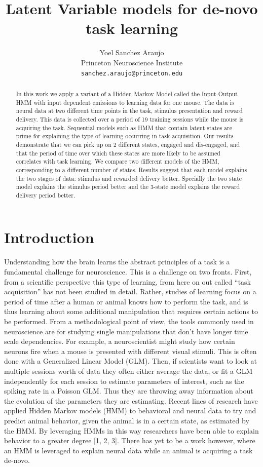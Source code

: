 \documentclass{article}
\title{Latent Variable models for de-novo task learning}
\author{%
  Yoel Sanchez Araujo\\
  Princeton Neuroscience Institute\\
  \texttt{sanchez.araujo@princeton.edu} \\
}
\begin{document}
\maketitle

\begin{abstract}
In this work we apply a variant of a Hidden Markov Model called the Input-Output HMM with input dependent emissions to learning data for one mouse. The data is neural data at two different time points in the task, stimulus presentation and reward delivery. This data is collected over a period of 19 training sessions while the mouse is acquiring the task. Sequential models such as HMM that contain latent states are prime for explaining the type of learning occurring in task acquisition. Our results demonstrate that we can pick up on 2 different states, engaged and dis-engaged, and that the period of time over which these states are more likely to be assumed correlates with task learning. We compare two different models of the HMM, corresponding to a different number of states. Results suggest that each model explains the two stages of data: stimulus and rewarded delivery better. Specially the two state model explains the stimulus period better and the 3-state model explains the reward delivery period better. 
\end{abstract}


\section{Introduction}
Understanding how the brain learns the abstract principles of a task is a fundamental challenge for neuroscience. This is a challenge on two fronts. First, from a scientific perspective this type of learning, from here on out called “task acquisition” has not been studied in detail. Rather, studies of learning focus on a period of time after a human or animal knows how to perform the task, and is thus learning about some additional manipulation that requires certain actions to be performed. From a methodological point of view, the tools commonly used in neuroscience are for studying single manipulations that don’t have longer time scale dependencies. For example, a neuroscientist might study how certain neurons fire when a mouse is presented with different visual stimuli. This is often done with a Generalized Linear Model (GLM). Then, if scientists want to look at multiple sessions worth of data they often either average the data, or fit a GLM independently for each session to estimate parameters of interest, such as the spiking rate in a Poisson GLM. Thus they are throwing away information about the evolution of the parameters they are estimating.  Recent lines of research have applied Hidden Markov models (HMM) to behavioral and neural data to try and predict animal behavior, given the animal is in a certain state, as estimated by the HMM. By leveraging HMMs in this way researchers have been able to explain behavior to a greater degree [1, 2, 3]. There has yet to be a work however, where an HMM is leveraged to explain neural data while an animal is acquiring a task de-novo. 
\end{document}
